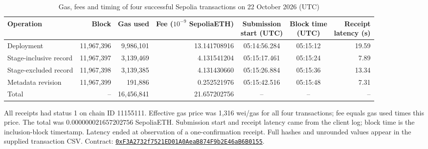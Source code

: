 \begin{table}[t]
\centering
\caption{Gas, fees and timing of four successful Sepolia transactions on 22 October 2026 (UTC)}
\label{tab:sepolia}
\small
\setlength{\tabcolsep}{4pt}
\begin{tabular}{@{}lrrrccr@{}}
\toprule
Operation & Block & Gas used & \shortstack{Fee ($10^{-9}$\\SepoliaETH)} & \shortstack{Submission\\start (UTC)} & \shortstack{Block time\\(UTC)} & \shortstack{Receipt\\latency (s)} \\
\midrule
Deployment & 11,967,396 & 9,986,101 & 13.141708916 & 05:14:56.284 & 05:15:12 & 19.59 \\
Stage-inclusive record & 11,967,397 & 3,139,469 & 4.131541204 & 05:15:17.461 & 05:15:24 & 7.89 \\
Stage-excluded record & 11,967,398 & 3,139,385 & 4.131430660 & 05:15:26.884 & 05:15:36 & 13.34 \\
Metadata revision & 11,967,399 & 191,886 & 0.252521976 & 05:15:42.516 & 05:15:48 & 7.31 \\
\midrule
Total & -- & 16,456,841 & 21.657202756 & -- & -- & -- \\
\bottomrule
\end{tabular}
\par\smallskip
\begin{minipage}{0.98\textwidth}\footnotesize
All receipts had status 1 on chain ID 11155111. Effective gas price was 1,316 wei/gas for all four transactions; fee equals gas used times this price. The total was $0.000000021657202756$ SepoliaETH. Submission start and receipt latency came from the client log; block time is the inclusion-block timestamp. Latency ended at observation of a one-confirmation receipt. Full hashes and unrounded values appear in the supplied transaction CSV. Contract: \href{https://sepolia.etherscan.io/address/0xF3A2732f7521ED01A0AeaB874F9b2E46aB6B0155}{\texttt{0xF3A2732f7521ED01A0AeaB874F9b2E46aB6B0155}}.
\end{minipage}
\end{table}
